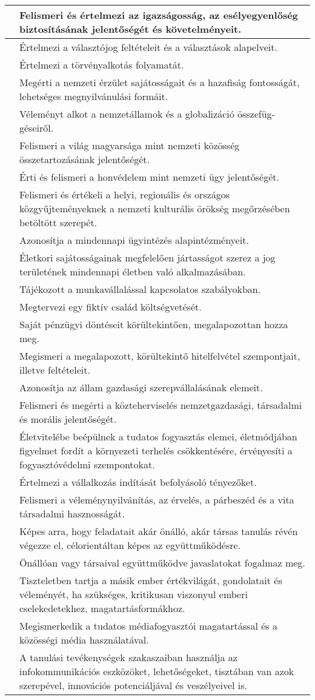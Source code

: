 \begin{longtable}[]{p{\evflength}@{\strut}>{\begin{minipage}{\columnlength}\strut}l<{\strut\end{minipage}}}
\tabularnewline
\hline
&
  Felismeri és értelmezi az igazságosság, az esélyegyenlőség
  biztosításának jelentőségét és követelményeit.
\tabularnewline
\hline
&
  Értelmezi a választójog feltételeit és a választások alapelveit.
\tabularnewline
\hline
&
  Értelmezi a törvényalkotás folyamatát.
\tabularnewline
\hline
&
  Megérti a nemzeti érzület sajátosságait és a hazafiság fontosságát,
  lehetséges megnyilvánulási formáit.
\tabularnewline
\hline
&
  Véleményt alkot a nemzetállamok és a globalizáció összefüg-\break géseiről.
\tabularnewline
\hline
&
  Felismeri a világ magyarsága mint nemzeti közösség összetartozásának
  jelentőségét.
\tabularnewline
\hline
&
  Érti és felismeri a honvédelem mint nemzeti ügy jelentőségét.
\tabularnewline
\hline
&
  Felismeri és értékeli a helyi, regionális és országos közgyűjteményeknek
  a nemzeti kulturális örökség megőrzésében betöltött szerepét.
\tabularnewline
\hline
&
  Azonosítja a mindennapi ügyintézés alapintézményeit.
\tabularnewline
\hline
&
  Életkori sajátosságainak megfelelően jártasságot szerez a jog
  területének mindennapi életben való alkalmazásában.
\tabularnewline
\hline
&
  Tájékozott a munkavállalással kapcsolatos szabályokban.
\tabularnewline
\hline
&
  Megtervezi egy fiktív család költségvetését.
\tabularnewline
\hline
&
  Saját pénzügyi döntéseit körültekintően, megalapozottan hozza meg.
\tabularnewline
\hline
&
  Megismeri a megalapozott, körültekintő hitelfelvétel szempontjait,
  illetve feltételeit.
\tabularnewline
\hline
&
  Azonosítja az állam gazdasági szerepvállalásának elemeit.
\tabularnewline
\hline
&
  Felismeri és megérti a közteherviselés nemzetgazdasági, társadalmi és
  morális jelentőségét.
\tabularnewline
\hline
&
  Életvitelébe beépülnek a tudatos fogyasztás elemei, életmódjában
  figyelmet fordít a környezeti terhelés csökkentésére, érvényesíti a
  fogyasztóvédelmi szempontokat.
\tabularnewline
\hline
&
  Értelmezi a vállalkozás indítását befolyásoló tényezőket.
\tabularnewline
\hline
&
  Felismeri a véleménynyilvánítás, az érvelés, a párbeszéd és a vita
  társadalmi hasznosságát.
\tabularnewline
\hline
&
  Képes arra, hogy feladatait akár önálló, akár társas tanulás révén
  végezze el, célorientáltan képes az együttműködésre.
\tabularnewline
\hline
&
  Önállóan vagy társaival együttműködve javaslatokat fogalmaz meg.
\tabularnewline
\hline
&
  Tiszteletben tartja a másik ember értékvilágát, gondolatait és
  véleményét, ha szükséges, kritikusan viszonyul emberi cselekedetekhez,
  magatartásformákhoz.
\tabularnewline
\hline
&
  Megismerkedik a tudatos médiafogyasztói magatartással és a közösségi
  média használatával.
\tabularnewline
\hline
&
  A tanulási tevékenységek szakaszaiban használja az infokommunikációs
  eszközöket, lehetőségeket, tisztában van azok szerepével, innovációs
  potenciáljával és veszélyeivel is.
\tabularnewline
\hline
\end{longtable}

